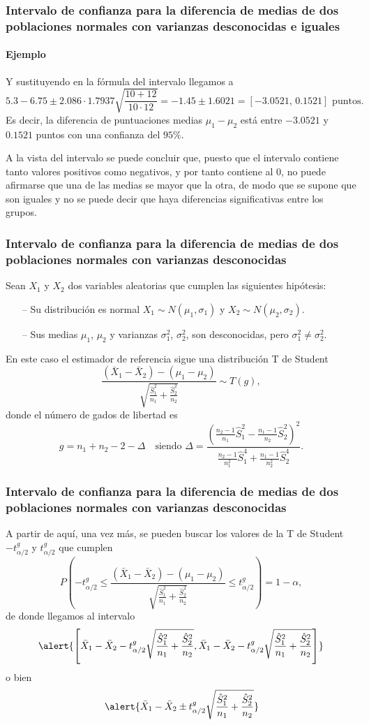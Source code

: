 \begin{frame}
\frametitle{Intervalo de confianza para la diferencia de medias de dos poblaciones normales con varianzas desconocidas
e iguales}
\framesubtitle{Ejemplo}
Y sustituyendo en la fórmula del intervalo llegamos a
\[
5.3-6.75 \pm 2.086\cdot 1.7937\sqrt{\frac{10+12}{10\cdot 12}} = -1.45\pm 1.6021 = [-3.0521,\,0.1521] \text{ puntos}.
\]
Es decir, la diferencia de puntuaciones medias $\mu_1-\mu_2$ está entre $-3.0521$ y $0.1521$ puntos con una confianza
del $95\%$.

A la vista del intervalo se puede concluir que, puesto que el intervalo contiene tanto valores positivos como
negativos, y por tanto contiene al 0, no puede afirmarse que una de las medias se mayor que la otra, de modo que se
supone que son iguales y no se puede decir que haya diferencias significativas entre los grupos.
\end{frame}


\begin{frame}
\frametitle{Intervalo de confianza para la diferencia de medias de dos poblaciones normales con varianzas desconocidas}
Sean $X_1$ y $X_2$ dos variables aleatorias que cumplen las siguientes hipótesis:
\begin{itemize}
\item[--] Su distribución es normal $X_1\sim N(\mu_1,\sigma_1)$ y $X_2\sim N(\mu_2,\sigma_2)$.
\item[--] Sus medias $\mu_1$, $\mu_2$ y varianzas $\sigma_1^2$, $\sigma_2^2$, son desconocidas, pero $\sigma^2_1\not =
\sigma^2_2$.
\end{itemize}
En este caso el estimador de referencia sigue una distribución T de Student
\[
\frac{(\bar{X}_1-\bar{X}_2)-(\mu_1-\mu_2)}{\sqrt{\frac{\hat{S}^2_1}{n_1}+\frac{\hat{S}^2_2}{n_2}}} \sim T(g),
\]
donde el número de gados de libertad es
\[
g=n_1+n_2-2-\Delta\quad \text{siendo } \Delta =
\frac{(\frac{n_2-1}{n_1}\hat{S}_1^2-\frac{n_1-1}{n_2}\hat{S}_2^2)^2}{\frac{n_2-1}{n_1^2}\hat{S}_1^4+\frac{n_1-1}{n_2^2}\hat{S}_2^4}.
\]
\end{frame}


\begin{frame}
\frametitle{Intervalo de confianza para la diferencia de medias de dos poblaciones normales con varianzas desconocidas}
A partir de aquí, una vez más, se pueden buscar los valores de la T de Student $-t^{g}_{\alpha/2}$ y $t^{g}_{\alpha/2}$ que cumplen
\[
P\left(-t^{g}_{\alpha/2}\leq \frac{(\bar{X}_1-\bar{X}_2)-(\mu_1-\mu_2)}{\sqrt{\frac{\hat{S}^2_1}{n_1}+\frac{\hat{S}^2_2}{n_2}}} \leq t^{g}_{\alpha/2}\right) = 1-\alpha,
\]
de donde llegamos al intervalo
\[
\alert{\left[\bar{X}_1-\bar{X}_2-t^{g}_{\alpha/2}\sqrt{\frac{\hat{S}^2_1}{n_1}+\frac{\hat{S}^2_2}{n_2}},\bar{X}_1-\bar{X}_2-t^{g}_{\alpha/2}\sqrt{\frac{\hat{S}^2_1}{n_1}+\frac{\hat{S}^2_2}{n_2}}\right]}
\]
o bien
\[
\alert{\bar{X}_1-\bar{X}_2\pm t^{g}_{\alpha/2}\sqrt{\frac{\hat{S}^2_1}{n_1}+\frac{\hat{S}^2_2}{n_2}}}
\]
\end{frame}


